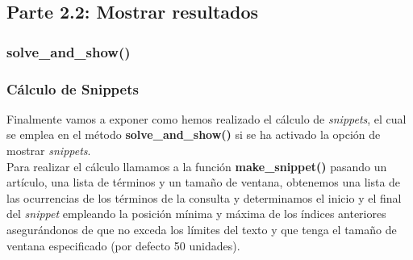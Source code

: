 \documentclass[12pt,a4paper]{article}
\begin{document}
\subsection{Parte 2.2: Mostrar resultados}
\subsubsection{solve\_and\_show()}


\subsubsection{Cálculo de Snippets}
Finalmente vamos a exponer como hemos realizado el cálculo de \textit{snippets}, el cual se emplea en el método \textbf{solve\_and\_show() } si se ha activado la opción de mostrar \textit{snippets}.\\
Para realizar el cálculo llamamos a la función \textbf{make\_snippet()} pasando un artículo, una lista de términos y un tamaño de ventana, obtenemos una lista de las ocurrencias de los términos de la consulta y determinamos el inicio y el final del \textit{snippet} empleando la posición mínima y máxima de los índices anteriores asegurándonos de que no exceda los límites del texto y que tenga el tamaño de ventana especificado (por defecto 50 unidades).
\end{document}
